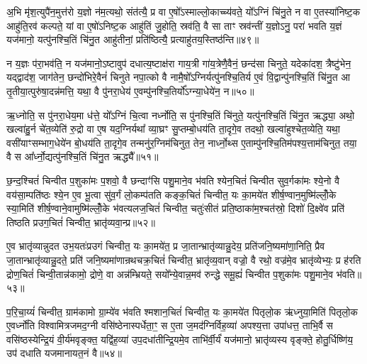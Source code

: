 अ॒भि मृ॑श॒त्युपै॑न॒मुत्त॑रो य॒ज्ञो न॑म॒त्यथो॒ संत॑त्यै॒ प्र वा ए॒षो᳚\-ऽस्माल्लो॒काच्च्य॑वते॒ यो᳚\-ऽग्निं चि॑नु॒ते न वा ए॒तस्या॑निष्ट॒क आहु॑ति॒रव॑ कल्पते॒ यां वा ए॒षो॑\-ऽनिष्ट॒क आहु॑तिं जु॒होति॒ स्रव॑ति॒ वै सा ताꣳ स्रव॑न्तीं य॒ज्ञो\-ऽनु॒ परा॑ भवति य॒ज्ञं यज॑मानो॒ यत्पु॑नश्चि॒तिं चि॑नु॒त आहु॑तीनां॒ प्रति॑ष्ठित्यै॒ प्रत्याहु॑तय॒स्तिष्ठ॑न्ति॥४९॥

न य॒ज्ञः प॑रा॒भव॑ति॒ न यज॑मानो॒\-ऽष्टावुप॑ दधात्य॒ष्टाक्ष॑रा गाय॒त्री गा॑य॒त्रेणै॒वैनं॒ छन्द॑सा चिनुते॒ यदेका॑दश॒ त्रैष्टु॑भेन॒ यद्द्वाद॑श॒ जाग॑तेन॒ छन्दो॑भिरे॒वैनं॑ चिनुते नपा॒त्को वै नामै॒षो᳚\-ऽग्निर्यत्पु॑नश्चि॒तिर्य ए॒वं वि॒द्वान्पु॑नश्चि॒तिं चि॑नु॒त आ तृ॒तीया॒त्पुरु॑षा॒दन्न॑मत्ति॒ यथा॒ वै पु॑नरा॒धेय॑ ए॒वम्पु॑नश्चि॒तिर्यो᳚\-ऽग्न्या॒धेये॑न॒ न॥५०॥

ऋ॒ध्नोति॒ स पु॑नरा॒धेय॒मा ध॑त्ते॒ यो᳚\-ऽग्निं चि॒त्वा नर्ध्नोति॒ स पु॑नश्चि॒तिं चि॑नुते॒ यत्पु॑नश्चि॒तिं चि॑नु॒त ऋद्ध्या॒ अथो॒ खल्वा॑हु॒र्न चे॑त॒व्येति॑ रु॒द्रो वा ए॒ष यद॒ग्निर्यथा᳚ व्या॒घ्रꣳ सु॒प्तम्बो॒धय॑ति ता॒दृगे॒व तदथो॒ खल्वा॑हुश्चेत॒व्येति॒ यथा॒ वसी॑याꣳसम्भाग॒धेये॑न बो॒धय॑ति ता॒दृगे॒व तन्मनु॑र॒ग्निम॑चिनुत॒ तेन॒ नार्ध्नो॒थ्स ए॒ताम्पु॑नश्चि॒तिम॑पश्य॒त्ताम॑चिनुत॒ तया॒ वै स आ᳚र्ध्नो॒द्यत्पु॑नश्चि॒तिं चि॑नु॒त ऋद्ध्यै᳚॥५१॥

{\anuvakamend[{त्रि॒वृदथ॒ तिष्ठ॑न्त्यग्न्या॒धेये॑न॒ नाचि॑नुत स॒प्तद॑श च॥10॥}]}

छ॒न्द॒श्चितं॑ चिन्वीत प॒शुका॑मः प॒शवो॒ वै छन्दाꣳ॑सि पशु॒माने॒व भ॑वति श्येन॒चितं॑ चिन्वीत सुव॒र्गका॑मः श्ये॒नो वै वय॑सा॒म्पति॑ष्ठः श्ये॒न ए॒व भू॒त्वा सु॑व॒र्गं लो॒कम्प॑तति कङ्क॒चितं॑ चिन्वीत॒ यः का॒मये॑त शीर्\mbox{}ष॒ण्वान॒मुष्मि॑ल्लोँ॒के स्या॒मिति॑ शीर्\mbox{}ष॒ण्वाने॒वामुष्मि॑ल्लोँ॒के भ॑वत्यलज॒चितं॑ चिन्वीत॒ चतुः॑सीतं प्रति॒ष्ठाका॑म॒श्चत॑स्रो॒ दिशो॑ दि॒क्ष्वे॑व प्रति॑ तिष्ठति प्रउग॒चितं॑ चिन्वीत॒ भ्रातृ॑व्यवा॒न्प्र॥५२॥

ए॒व भ्रातृ॑व्यान्नुदत उभ॒यतः॑प्रउगं चिन्वीत॒ यः का॒मये॑त॒ प्र जा॒तान्भ्रातृ॑व्यान्नु॒देय॒ प्रति॑जनि॒ष्यमा॑णा॒निति॒ प्रैव जा॒तान्भ्रातृ॑व्यान्नु॒दते॒ प्रति॑ जनि॒ष्यमा॑णान्रथचक्र॒चितं॑ चिन्वीत॒ भ्रातृ॑व्य॒वान् वज्रो॒ वै रथो॒ वज्र॑मे॒व भ्रातृ॑व्येभ्यः॒ प्र ह॑रति द्रोण॒चितं॑ चिन्वी॒तान्न॑कामो॒ द्रोणे॒ वा अन्न॑म्भ्रियते॒ सयो᳚न्ये॒वान्न॒मव॑ रुन्द्धे समू॒ह्यं॑ चिन्वीत प॒शुका॑मः पशु॒माने॒व भ॑वति॥५३॥

प॒रि॒चा॒य्यं॑ चिन्वीत॒ ग्राम॑कामो ग्रा॒म्ये॑व भ॑वति श्मशान॒चितं॑ चिन्वीत॒ यः का॒मये॑त पितृलो॒क ऋ॑ध्नुया॒मिति॑ पितृलो॒क ए॒वर्ध्नो॑ति विश्वामित्रजमद॒ग्नी वसि॑ष्ठेनास्पर्धेता॒ꣳ॒ स ए॒ता ज॒मद॑ग्निर्विह॒व्या॑ अपश्य॒त्ता उपा॑धत्त॒ ताभि॒र्वै स वसि॑ष्ठस्येन्द्रि॒यं वी॒र्य॑मवृङ्क्त॒ यद्वि॑ह॒व्या॑ उप॒दधा॑तीन्द्रि॒यमे॒व ताभि॑र्वी॒र्यं॑ यज॑मानो॒ भ्रातृ॑व्यस्य वृङ्क्ते॒ होतु॒र्धिष्णि॑य॒ उप॑ दधाति यजमानायत॒नं वै॥५४॥


